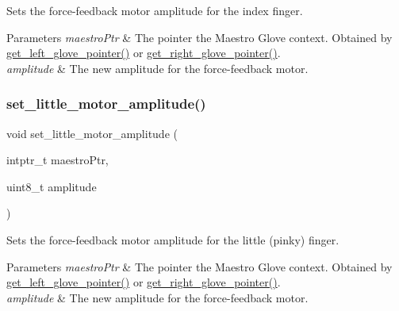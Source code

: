 Sets the force-\/feedback motor amplitude for the index finger. 
\begin{DoxyParams}{Parameters}
{\em maestro\+Ptr} & The pointer the Maestro Glove context. Obtained by \hyperlink{group__glove_management_ga63ce3c99d4a8b8db851b22af9185764e}{get\+\_\+left\+\_\+glove\+\_\+pointer()} or \hyperlink{group__glove_management_ga9b8fd9d91aeac3f8da50f7a7eba0c32b}{get\+\_\+right\+\_\+glove\+\_\+pointer()}. \\
\hline
{\em amplitude} & The new amplitude for the force-\/feedback motor. \\
\hline
\end{DoxyParams}
\mbox{\label{group__force_feedback_control_ga7bf117f412a5a181467035ff97515866}} 
\subsubsection{\texorpdfstring{set\+\_\+little\+\_\+motor\+\_\+amplitude()}{set\_little\_motor\_amplitude()}}
{\footnotesize\ttfamily void set\+\_\+little\+\_\+motor\+\_\+amplitude (\begin{DoxyParamCaption}\item[{intptr\+\_\+t}]{maestro\+Ptr,  }\item[{uint8\+\_\+t}]{amplitude }\end{DoxyParamCaption})}

Sets the force-\/feedback motor amplitude for the little (pinky) finger. 
\begin{DoxyParams}{Parameters}
{\em maestro\+Ptr} & The pointer the Maestro Glove context. Obtained by \hyperlink{group__glove_management_ga63ce3c99d4a8b8db851b22af9185764e}{get\+\_\+left\+\_\+glove\+\_\+pointer()} or \hyperlink{group__glove_management_ga9b8fd9d91aeac3f8da50f7a7eba0c32b}{get\+\_\+right\+\_\+glove\+\_\+pointer()}. \\
\hline
{\em amplitude} & The new amplitude for the force-\/feedback motor. \\
\hline
\end{DoxyParams}
\mbox{\label{group__force_feedback_control_gace05e531e30dc784432e8bffa0fdb72b}} 

